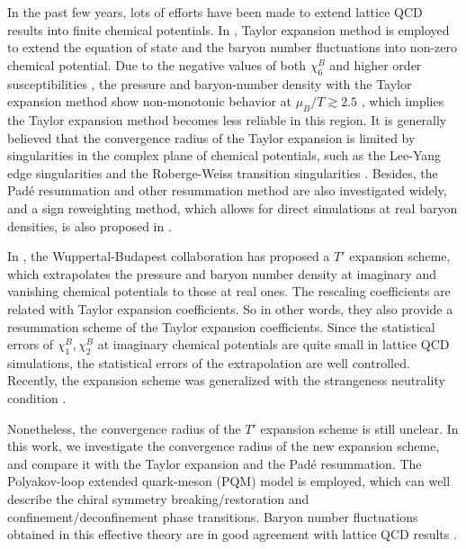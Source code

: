 \documentclass[%
reprint,
superscriptaddress,
preprintnumbers,
amsmath,amssymb,
aps,
prd,
]{revtex4-2}
\begin{document}
In the past few years, lots of efforts have been made to extend lattice QCD results into finite chemical potentials. In \cite{Bazavov:2017dus, HotQCD:2017qwq}, Taylor expansion method is employed to extend the equation of state and the baryon number fluctuations into non-zero chemical potential. Due to the negative values of both $\chi_6^B$ and higher order susceptibilities \cite{Borsanyi:2018grb, Bazavov:2020bjn, Borsanyi:2023wno}, the pressure and baryon-number density with the Taylor expansion method show non-monotonic behavior at $\mu_B/T \gtrsim 2.5$ \cite{Bazavov:2017dus}, which implies the Taylor expansion method becomes less reliable in this region. It is generally believed that the convergence radius of the Taylor expansion is limited by singularities in the complex plane of chemical potentials, such as the Lee-Yang edge singularities \cite{Mukherjee:2019eou, Borsanyi:2013hza, Basar:2021gyi, Connelly:2020gwa, Mukherjee:2021tyg, Karsch:2023rfb} and the Roberge-Weiss transition singularities \cite{Vovchenko:2017gkg}. Besides, the Pad\'e resummation \cite{Karsch:2010hm, Datta:2016ukp, Pasztor:2020dur, Bollweg:2022rps}  and other resummation method \cite{Mondal:2021jxk, Mukherjee:2021tyg} are also investigated widely, and a sign reweighting method, which allows for direct simulations at real baryon densities, is also proposed in \cite{Borsanyi:2021hbk, Pasztor:2021ray, Borsanyi:2022soo}.

In \cite{Borsanyi:2021sxv}, the Wuppertal-Budapest collaboration has proposed a $T'$ expansion scheme, which extrapolates the pressure and baryon number density at imaginary and vanishing chemical potentials to those at real ones. The rescaling coefficients are related with Taylor expansion coefficients. So in other words, they also provide a resummation scheme of the Taylor expansion coefficients. Since the statistical errors of $\chi_1^B,\chi_2^B$ at imaginary chemical potentials are quite small in lattice QCD simulations, the statistical errors of the extrapolation are well controlled. Recently, the expansion scheme was generalized with the strangeness neutrality condition \cite{Borsanyi:2022qlh}. 

Nonetheless, the convergence radius of the $T'$ expansion scheme is still unclear. In this work, we investigate the convergence radius of the new expansion scheme, and compare it with the Taylor expansion and the Pad\'e resummation. The Polyakov-loop extended quark-meson (PQM) model is employed, which can well describe the chiral symmetry breaking/restoration and confinement/deconfinement phase transitions. Baryon number fluctuations obtained in this effective theory are in good agreement with lattice QCD results \cite{Fu:2015naa, Fu:2021oaw, Fu:2023lcm}.
\end{document}

